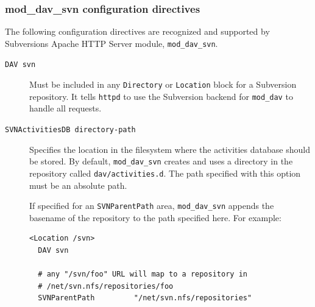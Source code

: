 \subsubsection{mod\_dav\_svn configuration
directives}\label{svn.serverconfig.httpd.ref.mod_dav_svn}

The following configuration directives are recognized and supported by
Subversion\textquotesingle s Apache HTTP Server module,
\texttt{mod\_dav\_svn}.

\begin{description}
\item[\texttt{DAV\ svn}]
Must be included in any \texttt{Directory} or \texttt{Location} block
for a Subversion repository. It tells \texttt{httpd} to use the
Subversion backend for \texttt{mod\_dav} to handle all requests.
\item[\texttt{SVNActivitiesDB\ directory-path}]
Specifies the location in the filesystem where the activities database
should be stored. By default, \texttt{mod\_dav\_svn} creates and uses a
directory in the repository called \texttt{dav/activities.d}. The path
specified with this option must be an absolute path.

If specified for an \texttt{SVNParentPath} area, \texttt{mod\_dav\_svn}
appends the basename of the repository to the path specified here. For
example:

\begin{verbatim}
<Location /svn>
  DAV svn

  # any "/svn/foo" URL will map to a repository in 
  # /net/svn.nfs/repositories/foo
  SVNParentPath         "/net/svn.nfs/repositories"


\end{verbatim}
\end{description}
